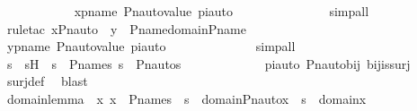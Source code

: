 \begin{isabellebody}
\ \ \ \ \ \ \ \ \ \ \isamarkupfalse%
\ xpname\ Pn{\isacharunderscore}{\kern0pt}auto{\isacharunderscore}{\kern0pt}value\ piauto\ \isanewline
\ \ \ \ \ \ \ \ \ \ \ \ \isamarkupfalse%
\ simp{\isacharunderscore}{\kern0pt}all\isanewline
\ \ \ \ \ \ \ \ \ \ \isamarkupfalse%
\ {\isacharparenleft}{\kern0pt}rule{\isacharunderscore}{\kern0pt}tac\ x{\isacharequal}{\kern0pt}{\isachardoublequoteopen}{\isacharparenleft}{\kern0pt}Pn{\isacharunderscore}{\kern0pt}auto{\isacharparenleft}{\kern0pt}{\isasympi}{\isacharparenright}{\kern0pt}\ {\isacharbackquote}{\kern0pt}\ y{\isacharparenright}{\kern0pt}{\isachardoublequoteclose}\ \ P{\isacharunderscore}{\kern0pt}name{\isacharunderscore}{\kern0pt}domain{\isacharunderscore}{\kern0pt}P{\isacharunderscore}{\kern0pt}name{\isacharprime}{\kern0pt}{\isacharparenright}{\kern0pt}\ \isanewline
\ \ \ \ \ \ \ \ \ \ \isamarkupfalse%
\ ypname\ Pn{\isacharunderscore}{\kern0pt}auto{\isacharunderscore}{\kern0pt}value\ piauto\ \isanewline
\ \ \ \ \ \ \ \ \ \ \ \isamarkupfalse%
\ simp{\isacharunderscore}{\kern0pt}all\ \isanewline
\ \ \ \ \ \ \ \ \ \ \isamarkupfalse%
\ \isanewline
\ \ \ \ \ \ \ \ \isamarkupfalse%
\ \isamarkupfalse%
\ s\ \ sH\ {\isacharcolon}{\kern0pt}\ {\isachardoublequoteopen}s\ {\isasymin}\ P{\isacharunderscore}{\kern0pt}names{\isachardoublequoteclose}\ {\isachardoublequoteopen}s{\isacharprime}{\kern0pt}\ {\isacharequal}{\kern0pt}\ Pn{\isacharunderscore}{\kern0pt}auto{\isacharparenleft}{\kern0pt}{\isasympi}{\isacharparenright}{\kern0pt}{\isacharbackquote}{\kern0pt}s{\isachardoublequoteclose}\ \isanewline
\ \ \ \ \ \ \ \ \ \ \isamarkupfalse%
\ piauto\ Pn{\isacharunderscore}{\kern0pt}auto{\isacharunderscore}{\kern0pt}bij\ bij{\isacharunderscore}{\kern0pt}is{\isacharunderscore}{\kern0pt}surj\ \isamarkupfalse%
\ surj{\isacharunderscore}{\kern0pt}def\ \isamarkupfalse%
\ blast\ \isanewline
\isanewline
\ \ \ \ \ \ \ \ \isamarkupfalse%
\ domain{\isacharunderscore}{\kern0pt}lemma\ {\isacharcolon}{\kern0pt}\ {\isachardoublequoteopen}{\isasymAnd}x{\isachardot}{\kern0pt}\ x\ {\isasymin}\ P{\isacharunderscore}{\kern0pt}names\ {\isasymLongrightarrow}\ s{\isacharprime}{\kern0pt}\ {\isasymin}\ domain{\isacharparenleft}{\kern0pt}Pn{\isacharunderscore}{\kern0pt}auto{\isacharparenleft}{\kern0pt}{\isasympi}{\isacharparenright}{\kern0pt}{\isacharbackquote}{\kern0pt}x{\isacharparenright}{\kern0pt}\ {\isasymLongrightarrow}\ s\ {\isasymin}\ domain{\isacharparenleft}{\kern0pt}x{\isacharparenright}{\kern0pt}{\isachardoublequoteclose}\ \isanewline

\end{isabellebody}
